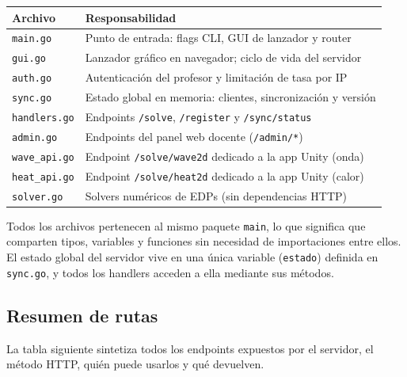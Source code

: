 \documentclass[12pt, a4paper]{article}
\begin{document}
\begin{center}
\begin{tabular}{ll}
\toprule
\textbf{Archivo} & \textbf{Responsabilidad} \\
\midrule
\texttt{main.go}      & Punto de entrada: flags CLI, GUI de lanzador y router \\
\texttt{gui.go}       & Lanzador gráfico en navegador; ciclo de vida del servidor \\
\texttt{auth.go}      & Autenticación del profesor y limitación de tasa por IP \\
\texttt{sync.go}      & Estado global en memoria: clientes, sincronización y versión \\
\texttt{handlers.go}  & Endpoints \texttt{/solve}, \texttt{/register} y \texttt{/sync/status} \\
\texttt{admin.go}     & Endpoints del panel web docente (\texttt{/admin/*}) \\
\texttt{wave\_api.go} & Endpoint \texttt{/solve/wave2d} dedicado a la app Unity (onda) \\
\texttt{heat\_api.go} & Endpoint \texttt{/solve/heat2d} dedicado a la app Unity (calor) \\
\texttt{solver.go}    & Solvers numéricos de EDPs (sin dependencias HTTP) \\
\bottomrule
\end{tabular}
\end{center}

Todos los archivos pertenecen al mismo paquete \texttt{main}, lo que significa que
comparten tipos, variables y funciones sin necesidad de importaciones entre ellos. El
estado global del servidor vive en una única variable (\texttt{estado}) definida en
\texttt{sync.go}, y todos los handlers acceden a ella mediante sus métodos.

\subsection{Resumen de rutas}

La tabla siguiente sintetiza todos los endpoints expuestos por el servidor, el método
HTTP, quién puede usarlos y qué devuelven.
\end{document}
